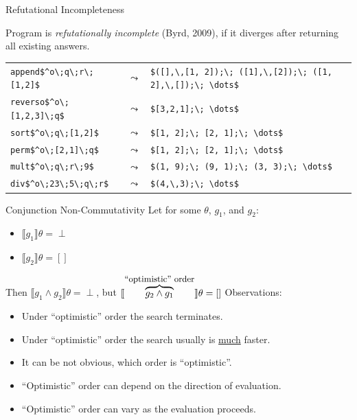 \documentclass{beamer}
\let\\\tabularnewline
\let\\\tabularnewline
\theoremstyle{definition}
\theoremstyle{plain} %
\begin{document}
\begin{frame}[fragile]{Refutational Incompleteness}

Program is \emph{refutationally incomplete} (Byrd, 2009), if it diverges after returning all existing answers.
\vskip10mm

\begin{tabular}{lcl}
  \lstinline|append$^o\;q\;r\;[1,2]$| & $\leadsto$ & \lstinline|$([],\,[1, 2]);\; ([1],\,[2]);\; ([1, 2],\,[]);\; \dots$|\\[2mm]
  \lstinline|reverso$^o\;[1,2,3]\;q$| & $\leadsto$ & \lstinline|$[3,2,1];\; \dots$|\\[2mm]
  \lstinline|sort$^o\;q\;[1,2]$| & $\leadsto$ & \lstinline|$[1, 2];\; [2, 1];\; \dots$|\\[2mm]
  \lstinline|perm$^o\;[2,1]\;q$| & $\leadsto$ & \lstinline|$[1, 2];\; [2, 1];\; \dots$|\\[2mm]
  \lstinline|mult$^o\;q\;r\;9$| & $\leadsto$ & \lstinline|$(1, 9);\; (9, 1);\; (3, 3);\; \dots$|\\[2mm]
  \lstinline|div$^o\;23\;5\;q\;r$| & $\leadsto$ & \lstinline|$(4,\,3);\; \dots$|
\end{tabular}

\vskip3mm

\end{frame}

\begin{frame}{Conjunction Non-Commutativity}
\vskip5mm
Let for some $\theta$, $g_1$, and $g_2$:

\begin{itemize}
\item $\llbracket g_1\rrbracket\theta=\perp$
\item $\llbracket g_2\rrbracket\theta=[]$
\end{itemize}
\vskip5mm
Then $\llbracket g_1\wedge g_2\rrbracket\theta=\perp$, but $\llbracket\overbrace{g_2\wedge g_1}^{\mbox{\small ``optimistic'' order}}\rrbracket\theta=[]$
\vskip5mm
Observations:
\begin{itemize}
 \item Under ``optimistic'' order the search terminates.
 \item Under ``optimistic'' order the search usually is \underline{much} faster.
 \item It can be not obvious, which order is ``optimistic''.
 \item ``Optimistic'' order can depend on the direction of evaluation.
 \item ``Optimistic'' order can vary as the evaluation proceeds.
\end{itemize}

\end{frame}
\end{document}
